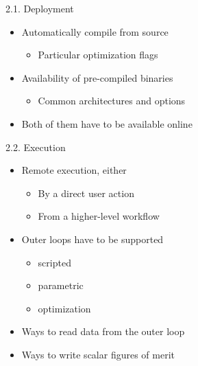 \documentclass[
  ignorenonframetext,
  aspectratio=169,
]{beamer}
\providecommand{\tightlist}{%
  \setlength{\itemsep}{0pt}\setlength{\parskip}{0pt}}
\begin{document}
\begin{frame}[fragile]{}
\protect\hypertarget{section-6}{}
\begin{columns}[T]
\begin{column}{0.5\textwidth}
\begin{block}{2.1. Deployment}
\protect\hypertarget{deployment}{}
\begin{itemize}
\tightlist
\item
  Automatically compile from source

  \begin{itemize}
  \tightlist
  \item
    Particular optimization flags
  \end{itemize}
\item
  Availability of pre-compiled binaries

  \begin{itemize}
  \tightlist
  \item
    Common architectures and options
  \end{itemize}
\item
  Both of them have to be available online
\end{itemize}
\end{block}

\begin{block}{2.2. Execution}
\protect\hypertarget{execution}{}
\begin{itemize}
\tightlist
\item
  Remote execution, either

  \begin{itemize}
  \tightlist
  \item
    By a direct user action
  \item
    From a higher-level workflow
  \end{itemize}
\item
  Outer loops have to be supported

  \begin{itemize}
  \tightlist
  \item
    scripted
  \item
    parametric
  \item
    optimization
  \end{itemize}
\item
  Ways to read data from the outer loop
\item
  Ways to write scalar figures of merit
\end{itemize}
\end{block}
\end{column}


\end{columns}
\end{frame}
\end{document}
